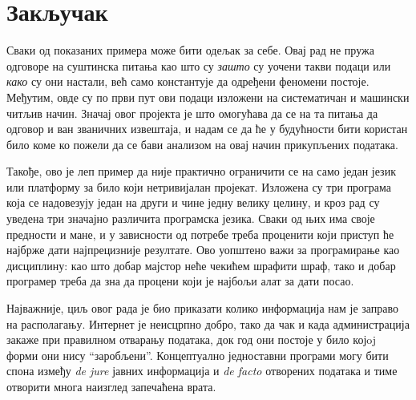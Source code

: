 \section{Закључак}
Сваки од показаних примера може бити одељак за себе. Овај рад не пружа одговоре на суштинска питања као што су \emph{зашто} су уочени такви подаци или \emph{како} су они настали, већ само константује да одређени феномени постоје. Међутим, овде су по први пут ови подаци изложени на систематичан и машински читљив начин. Значај овог пројекта је што омогућава да се на та питања да одговор и ван званичних извештаја, и надам се да ће у будућности бити користан било коме ко пожели да се бави анализом на овај начин прикупљених података. 

Такође, ово је леп пример да није практично ограничити се на само један језик или платформу за било који нетривијалан пројекат. Изложена су три програма која се надовезују један на други и чине једну велику целину, и кроз рад су уведена три значајно различита програмска језика. Сваки од њих има своје предности и мане, и у зависности од потребе треба проценити који приступ ће најбрже дати најпрецизније резултате. Ово уопштено важи за програмирање као дисциплину: као што добар мајстор неће чекићем шрафити шраф, тако и добар програмер треба да зна да процени који је најбољи алат за дати посао.

Најважније, циљ овог рада је био приказати колико информација нам је заправо на располагању. Интернет је неисцрпно добро, тако да чак и када администрација закаже при правилном отварању података, док год они постоје у било којoj форми они нису \enquote{заробљени}. Концептуално једноставни програми могу бити спона између \emph{de jure} јавних информација и \emph{de facto} отворених података и тиме отворити многа наизглед запечаћена врата.